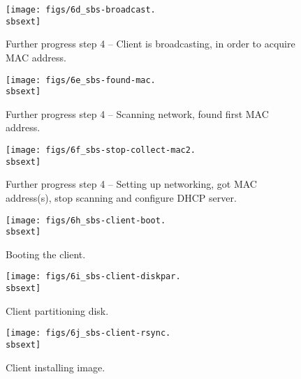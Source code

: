 \begin{figure}[htbp]
  \begin{center}
    \texttt{[image: figs/6d\_sbs-broadcast.\\sbsext]}
    \caption{Further progress step 4 -- Client is broadcasting, in order to acquire MAC address.}
    \label{fig:sbs-collect-broadcast}
  \end{center}
\end{figure}

\begin{figure}[htbp]
  \begin{center}
    \texttt{[image: figs/6e\_sbs-found-mac.\\sbsext]}
    \caption{Further progress step 4 -- Scanning network, found first MAC address.}
    \label{fig:sbs-setup-network2}
  \end{center}
\end{figure}


\begin{figure}[htbp]
  \begin{center}
    \texttt{[image: figs/6f\_sbs-stop-collect-mac2.\\sbsext]}
   \caption{Further progress step 4 -- Setting up networking, got MAC address(s), stop scanning and configure DHCP server.}
    \label{fig:sbs-setup-network3}
  \end{center}
\end{figure}

\setlength{\oddsidemargin}{-0.5in}
\setlength{\evensidemargin}{-0.5in}
\setlength{\textwidth}{7.5in}

\begin{figure}[htbp]
  \begin{center}
    \texttt{[image: figs/6h\_sbs-client-boot.\\sbsext]}
    \caption{Booting the client.}
    \label{fig:sbs-install-boot}
  \end{center}
\end{figure}

\begin{figure}[htbp]
  \begin{center}
    \texttt{[image: figs/6i\_sbs-client-diskpar.\\sbsext]}
    \caption{Client partitioning disk.}
    \label{fig:sbs-install-diskpar}
  \end{center}
\end{figure}
  

\begin{figure}[htbp]
  \begin{center}
    \texttt{[image: figs/6j\_sbs-client-rsync.\\sbsext]}
    \caption{Client installing image.}
    \label{fig:sbs-install-rsync}
  \end{center}
\end{figure}

